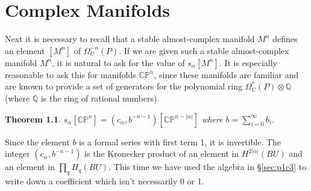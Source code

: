 \documentclass[../main]{subfiles}
\begin{document}
\newtheorem{thm}[equation]{Theorem}

\chapter{Complex Manifolds} %
\label{sec:p1c8}

Next it is necessary to recall that a stable almost-complex manifold $M^n$ defines an element $[M^n]$ of $\Omega^{-n}_U(P)$. If we are given such a stable almost-complex manifold $M^n$, it is natural to ask for the value of $s_\alpha [M^n]$. It is especially reasonable to ask this for manifolds $\mathbb{CP}^n$, since these manifolds are familiar and are known to provide a set of generators for the polynomial ring $\Omega_U^*(P) \otimes \mathbb{Q}$ (where $\mathbb{Q}$ is the ring of rational numbers).
\begin{thm}\label{thm:p1c08.1}
$s_\alpha[\mathbb{CP}^n] = (c_\alpha,b^{-n-1})[\mathbb{CP}^{n-|\alpha|}]$ where $b = \displaystyle \sum_{i=0}^\infty b_i$.
\end{thm}
\begin{explanation}
Since the element $b$ is a formal series with first term 1, it is invertible. The integer $(c_\alpha, b^{-n-1})$ is the Kronecker product of an element in $H^{2|\alpha|}(BU)$ and an element in $\prod_q H_q(BU)$. This time we have used the algebra in \S\ref{sec:p1c3} to write down a coefficient which isn't necessarily 0 or 1.
\end{explanation}
\end{document}
